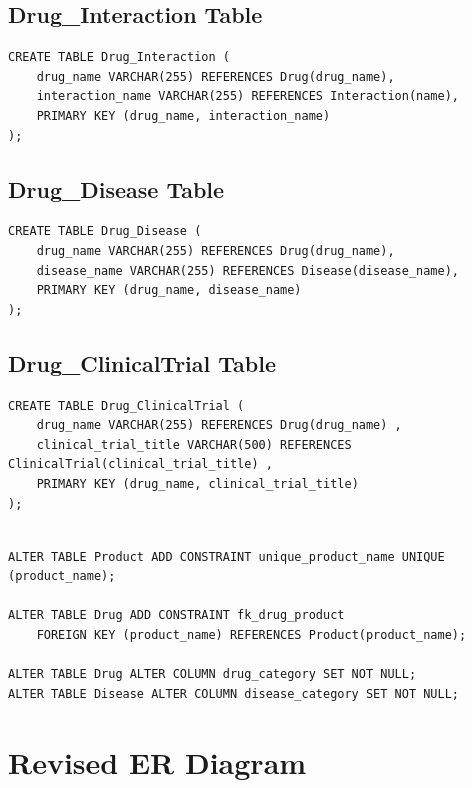 \documentclass[12pt,a4paper]{article}
\begin{document}
\subsection{Drug\_Interaction Table}

\begin{lstlisting}[style=sqlstyle]
CREATE TABLE Drug_Interaction (
    drug_name VARCHAR(255) REFERENCES Drug(drug_name),
    interaction_name VARCHAR(255) REFERENCES Interaction(name),
    PRIMARY KEY (drug_name, interaction_name)
);
\end{lstlisting}

\subsection{Drug\_Disease Table}

\begin{lstlisting}[style=sqlstyle]
CREATE TABLE Drug_Disease (
    drug_name VARCHAR(255) REFERENCES Drug(drug_name),
    disease_name VARCHAR(255) REFERENCES Disease(disease_name),
    PRIMARY KEY (drug_name, disease_name)
);
\end{lstlisting}

\subsection{Drug\_ClinicalTrial Table}

\begin{lstlisting}[style=sqlstyle]
CREATE TABLE Drug_ClinicalTrial (
    drug_name VARCHAR(255) REFERENCES Drug(drug_name) ,
    clinical_trial_title VARCHAR(500) REFERENCES ClinicalTrial(clinical_trial_title) ,
    PRIMARY KEY (drug_name, clinical_trial_title)
);
\end{lstlisting}


\begin{lstlisting}[style=sqlstyle]

ALTER TABLE Product ADD CONSTRAINT unique_product_name UNIQUE (product_name);

ALTER TABLE Drug ADD CONSTRAINT fk_drug_product 
    FOREIGN KEY (product_name) REFERENCES Product(product_name);

ALTER TABLE Drug ALTER COLUMN drug_category SET NOT NULL;
ALTER TABLE Disease ALTER COLUMN disease_category SET NOT NULL;
\end{lstlisting}

\section{Revised ER Diagram}
\end{document}
